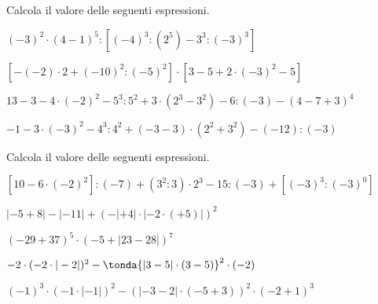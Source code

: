 \begin{esercizio} %
Calcola il valore delle seguenti espressioni.
 \begin{enumeratees}
 \item \((-3)^2\cdot(4-1)^5:[(-4)^3:(2^5)-3^3:(-3)^3]\)  
 \item \([-(-2)\cdot2+(-10)^2:(-5)^2]\cdot[3-5+2\cdot(-3)^2-5]\)  
 \item \(13-3-4\cdot(-2)^2-5^3:5^2+3\cdot(2^3-3^2)-6:(-3)-(4-7+3)^4\)
 \item \(-1-3\cdot(-3)^2-4^3:4^2+(-3-3)\cdot(2^2+3^2)-(-12):(-3)\) 
 \end{enumeratees}
\end{esercizio}

\begin{esercizio} %
Calcola il valore delle seguenti espressioni.
 \begin{enumeratees}
 \item \([10-6\cdot(-2)^2]:(-7)+(3^2:3)\cdot2^3-15:(-3)+[(-3)^3:(-3)^0]\)
 \item \(|-5+8|-|-11|+(-|+4|\cdot|-2\cdot(+5)|)^2\)  
 \item \((-29+37)^5\cdot(-5+|23-28|)^7\)  
 \item \(-2\cdot(-2\cdot|-2|)^2-\tonda{|3-5|\cdot(3-5) }^2\cdot(-2)\)
 \item \((-1)^3\cdot(-1\cdot|-1|)^2-(|-3-2|\cdot(-5+3))^2\cdot(-2+1)^3\)
 \end{enumeratees}
\end{esercizio}
